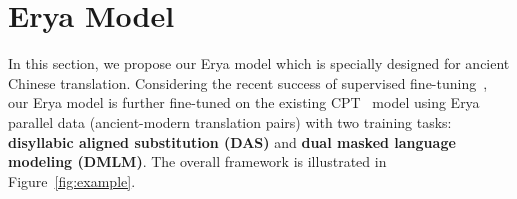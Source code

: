 \section{Erya Model}
\label{sec:model}


In this section, we propose our Erya model which is specially designed for ancient Chinese translation. Considering the recent success of supervised fine-tuning~\cite{DBLP:conf/nips/Ouyang0JAWMZASR22}, our Erya model is further fine-tuned on the existing CPT~\cite{DBLP:journals/corr/abs-2109-05729} model using Erya parallel data (\ie ancient-modern translation pairs) with two training tasks: \textbf{disyllabic aligned substitution (DAS)} and \textbf{dual masked language modeling (DMLM)}. %
The overall framework is illustrated in Figure~\ref{fig:example}. %


